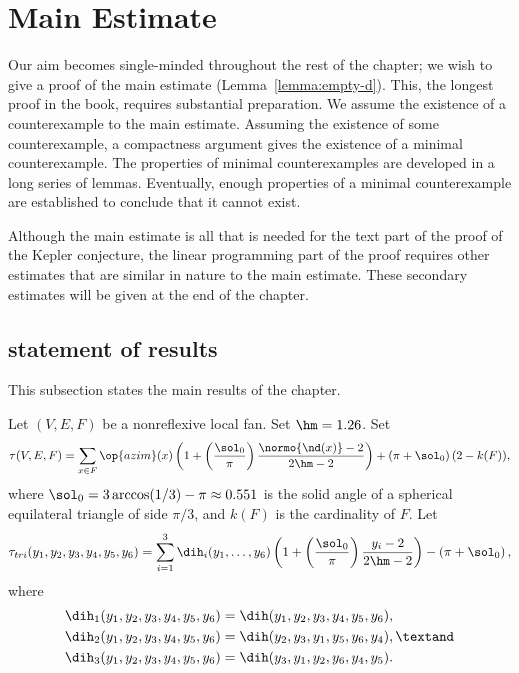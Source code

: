 \section{Main Estimate}\label{sec:weight}  

Our aim becomes single-minded throughout the rest of the chapter; we
wish to give a proof of the main estimate (Lemma~\ref{lemma:empty-d}).
This,  the longest proof in the book,  requires substantial
preparation.  We  assume the existence of a counterexample to the
main estimate.  Assuming the existence of some counterexample, a
compactness argument gives the existence of a minimal counterexample.
The properties of minimal counterexamples are developed in a long
series of lemmas.  Eventually, enough properties of a minimal
counterexample are established to conclude that it cannot exist.

Although the main estimate is all that is needed for the text part of
the proof of the Kepler conjecture, the linear programming part of the
proof requires other estimates that are similar in nature to the
main estimate.  These secondary estimates will be given at the end of the chapter.

\subsection{statement of results}\label{sec:statement}

This subsection states the main results of the chapter.

\begin{definition}\label{def:tau}
Let $(V,E,F)$ be a nonreflexive local fan.  Set $\hm = 1.26$.  Set
\[ 
  \tau(V,E,F) =\sum_{x\in F} \op{azim}(x)\left(1 + \left(\dfrac{\sol_0}{\pi}  \right)
    \dfrac{\normo{\nd(x)}-2}{2\hm-2}\right) 
+ \left(\pi+{\sol_0}\right) (2- k(F)),
\] 
where $\sol_0=3\arccos(1/3)-\pi\approx0.551$ is the solid angle of a
spherical equilateral triangle of side $\pi/3$, and $k(F)$ is the
cardinality of $F$.  
Let 
\begin{equation}\label{eqn:tautri}
  \tau_{tri}(y_1,y_2,y_3,y_4,y_5,y_6) =
  \sum_{i=1}^3 \dih_i(y_1,\ldots,y_6)
\left(1 + \left(\dfrac{\sol_0}{\pi}  \right)\dfrac{y_i -2}{2\hm-2}\right) 
- \left(\pi+{\sol_0}\right),
\end{equation}
where
\begin{align}\label{eqn:dihi}
\dih_1(y_1,y_2,y_3,y_4,y_5,y_6) &= \dih(y_1,y_2,y_3,y_4,y_5,y_6),\notag\\
\dih_2(y_1,y_2,y_3,y_4,y_5,y_6) &= \dih(y_2,y_3,y_1,y_5,y_6,y_4),\textand\notag \\
\dih_3(y_1,y_2,y_3,y_4,y_5,y_6) &= \dih(y_3,y_1,y_2,y_6,y_4,y_5).
\end{align}
\end{definition}


